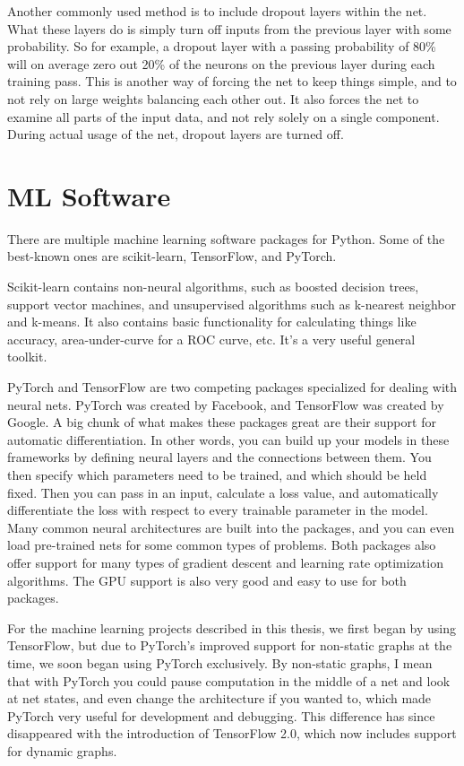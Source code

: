Another commonly used method is to include dropout layers within the net. What these layers do is simply turn off inputs from the previous layer with some probability. So for example, a dropout layer with a passing probability of 80\% will on average zero out 20\% of the neurons on the previous layer during each training pass. This is another way of forcing the net to keep things simple, and to not rely on large weights balancing each other out. It also forces the net to examine all parts of the input data, and not rely solely on a single component. During actual usage of the net, dropout layers are turned off.

\section{ML Software}

There are multiple machine learning software packages for Python. Some of the best-known ones are scikit-learn, TensorFlow, and PyTorch.

Scikit-learn contains non-neural algorithms, such as boosted decision trees, support vector machines, and unsupervised algorithms such as k-nearest neighbor and k-means. It also contains basic functionality for calculating things like accuracy, area-under-curve for a ROC curve, etc. It's a very useful general toolkit.

PyTorch and TensorFlow are two competing packages specialized for dealing with neural nets. PyTorch was created by Facebook, and TensorFlow was created by Google. A big chunk of what makes these packages great are their support for automatic differentiation. In other words, you can build up your models in these frameworks by defining neural layers and the connections between them. You then specify which parameters need to be trained, and which should be held fixed. Then you can pass in an input, calculate a loss value, and automatically differentiate the loss with respect to every trainable parameter in the model. Many common neural architectures are built into the packages, and you can even load pre-trained nets for some common types of problems. Both packages also offer support for many types of gradient descent and learning rate optimization algorithms. The GPU support is also very good and easy to use for both packages.

For the machine learning projects described in this thesis, we first began by using TensorFlow, but due to PyTorch's improved support for non-static graphs at the time, we soon began using PyTorch exclusively. By non-static graphs, I mean that with PyTorch you could pause computation in the middle of a net and look at net states, and even change the architecture if you wanted to, which made PyTorch very useful for development and debugging. This difference has since disappeared with the introduction of TensorFlow 2.0, which now includes support for dynamic graphs.

